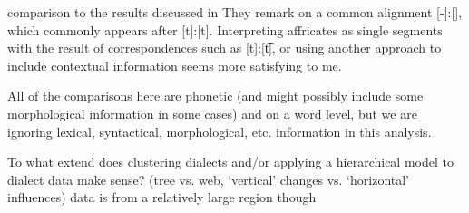 \documentclass{article}
\begin{document}
comparison to the results discussed in \cite{wieling2011bipartite}
They remark on a common alignment [-]:[\textesh], which commonly appears after [t]:[t]. Interpreting affricates as single segments with the result of correspondences such as [t]:[\t{t\textesh}], or using another approach to include contextual information seems more satisfying to me.


All of the comparisons here are phonetic (and might possibly include some morphological information in some cases) and on a word level, but we are ignoring lexical, syntactical, morphological, etc. information in this analysis.

To what extend does clustering dialects and/or applying a hierarchical model to dialect data make sense? (tree vs. web, `vertical' changes vs. `horizontal' influences)
data is from a relatively large region though



\end{document}
